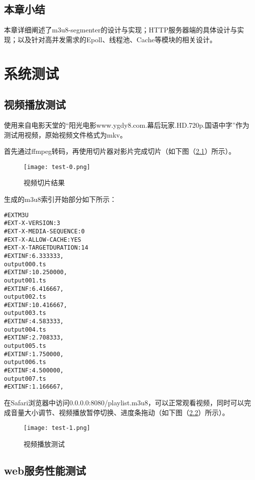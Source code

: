 \documentclass[bachelor]{thesis-uestc}
\begin{document}
\section{本章小结}

\par 本章详细阐述了m3u8-segmenter的设计与实现；HTTP服务器端的具体设计与实现；以及针对高并发需求的Epoll、线程池、Cache等模块的相关设计。

\chapter{系统测试}

\section{视频播放测试}

使用来自电影天堂的“阳光电影www.ygdy8.com.幕后玩家.HD.720p.国语中字”作为测试用视频，原始视频文件格式为mkv。

首先通过ffmpeg转码，再使用切片器对影片完成切片（如下图（\ref{test-0}）所示）。

\begin{figure}[h]
\texttt{[image: test-0.png]}
\caption{视频切片结果}
\label{test-0} 
\end{figure}
生成的m3u8索引开始部分如下所示：

\begin{lstlisting}
#EXTM3U
#EXT-X-VERSION:3
#EXT-X-MEDIA-SEQUENCE:0
#EXT-X-ALLOW-CACHE:YES
#EXT-X-TARGETDURATION:14
#EXTINF:6.333333,
output000.ts
#EXTINF:10.250000,
output001.ts
#EXTINF:6.416667,
output002.ts
#EXTINF:10.416667,
output003.ts
#EXTINF:4.583333,
output004.ts
#EXTINF:2.708333,
output005.ts
#EXTINF:1.750000,
output006.ts
#EXTINF:4.500000,
output007.ts
#EXTINF:1.166667,
\end{lstlisting}

在Safari浏览器中访问0.0.0.0:8080/playlist.m3u8，可以正常观看视频，同时可以完成音量大小调节、视频播放暂停切换、进度条拖动（如下图（\ref{test-1}）所示）。

\begin{figure}[h]
\texttt{[image: test-1.png]}
\caption{视频播放测试}
\label{test-1} 
\end{figure}

\section{web服务性能测试}
\end{document}
